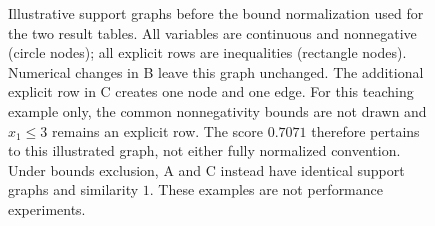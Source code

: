 \documentclass[10pt]{article}
\newcommand{\toygraph}[7]{%
 \node[wlvariable] (#1v1) at (2.25,1.6) {#2};
 \node[wlvariable] (#1v2) at (2.25,0) {#3};
 \node[row] (#1r1) at (.25,1.6) {#4};
 \node[row] (#1r2) at (.25,0) {#5};
 \draw[connection] (#1r1)--(#1v1) (#1r1)--(#1v2)
                   (#1r2)--(#1v1) (#1r2)--(#1v2);
 \ifnum#6=1
  \node[added] (#1r3) at (.25,-.85) {#7};
  \draw[graphorange,line width=1pt] (#1r3)--(#1v1);
 \fi}
\begin{document}
\begin{figure}[ht]
\centering
{}
\caption{Illustrative support graphs before the bound normalization used
for the two result tables. All variables are continuous and nonnegative (circle
nodes); all explicit rows are inequalities (rectangle nodes). Numerical
changes in B leave this graph unchanged. The additional explicit row in
C creates one node and one edge. For this teaching example only, the
common nonnegativity bounds are not drawn and $x_1\leq3$ remains an
explicit row. The score $0.7071$ therefore pertains to this illustrated
graph, not either fully normalized convention. Under bounds exclusion,
A and C instead have identical support graphs and similarity $1$.
These examples are not performance experiments.}
\label{fig:wl-encoding}
\end{figure}
\end{document}
